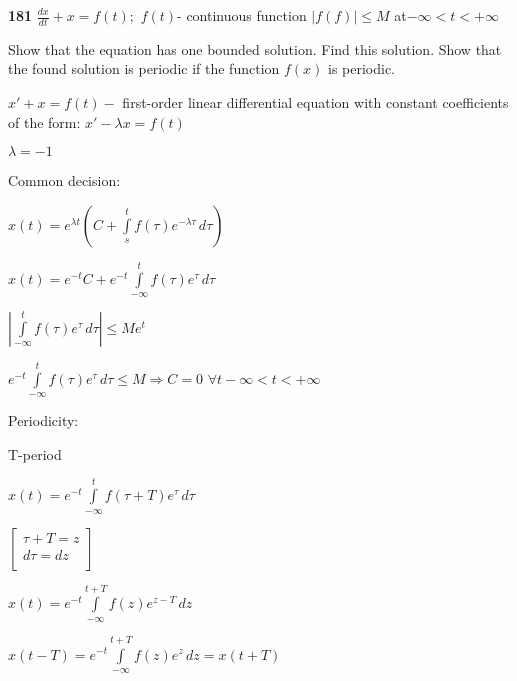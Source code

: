 \documentclass{article}
\begin{document}
\begin{flushleft}
{\bf 181 } $\displaystyle \frac{dx}{dt}+x=f(t); $ $f(t)$- continuous function $|f(f)|\leq M$ at$ -\infty<t<+\infty$

\end{flushleft}
Show that the equation has one bounded solution. Find this solution. Show that the found solution is periodic if the function $f(x)$ is periodic.
\begin{left}
\begin{spacing}{2}
$x'+x=f(t)-$ first-order linear differential equation with constant coefficients of the form: $x'-\lambda x=f(t)$

$\lambda=-1$
\end{spacing}
\end{left}
Common decision:
\begin{left}
\begin{spacing}{2}
$\displaystyle x(t)=e^{\lambda t}(C+\int\limits _s^t f(\tau)e^{-\lambda\tau}\,d\tau)$

$\displaystyle x(t)=e^{-t}C+e^{-t}\int\limits _{-\infty}^t f(\tau)e^{\tau}\,d\tau$

$\displaystyle |\int\limits _{-\infty}^t f(\tau)e^{\tau}\,d\tau| \leq Me^t$ 

$\displaystyle e^{-t}\int\limits _{-\infty}^t f(\tau)e^{\tau}\,d\tau \leq M \Rightarrow C=0$ $ \forall t -\infty<t<+\infty$ 

\end{spacing}
\end{left}
\begin{flushleft}
Periodicity:

T-period
\end{flushleft}
\begin{left}
\begin{spacing}{1}
$\displaystyle x(t)=e^{-t}\int\limits _{-\infty}^t f(\tau+T)e^{\tau}\,d\tau$
\end{spacing}
\end{left}
\begin{left}
\begin{spacing}{1.5}
$\left[
  \begin{array}{ccc}
     \tau + T = z \\
     d\tau = dz \\
  \end{array}
\right]$
\end{spacing}
\end{left}

\begin{left}
\begin{spacing}{3}
$\displaystyle x(t)=e^{-t}\int\limits _{-\infty}^{t+T} f(z)e^{z-T}\,dz$

$\displaystyle x(t-T)=e^{-t}\int\limits _{-\infty}^{t+T} f(z)e^{z}\,dz = x(t+T)$
\end{spacing}
\end{left}
\end{document}
